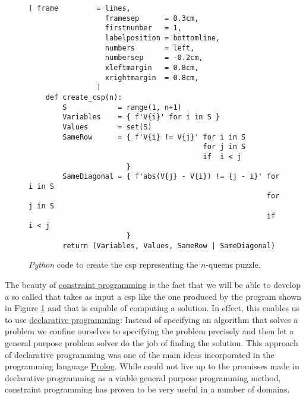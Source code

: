 \begin{figure}[!ht]
\centering
\begin{Verbatim}[ frame         = lines, 
                  framesep      = 0.3cm, 
                  firstnumber   = 1,
                  labelposition = bottomline,
                  numbers       = left,
                  numbersep     = -0.2cm,
                  xleftmargin   = 0.8cm,
                  xrightmargin  = 0.8cm,
                ]
    def create_csp(n):
        S            = range(1, n+1)           
        Variables    = { f'V{i}' for i in S }
        Values       = set(S)
        SameRow      = { f'V{i} != V{j}' for i in S
                                         for j in S
                                         if  i < j 
                       }
        SameDiagonal = { f'abs(V{j} - V{i}) != {j - i}' for i in S
                                                        for j in S 
                                                        if  i < j 
                       }
        return (Variables, Values, SameRow | SameDiagonal)
\end{Verbatim}
\vspace*{-0.3cm}
\caption{\textsl{Python} code to create the \ac{csp} representing the $n$-queens puzzle.}
\label{fig:N-Queens-Problem-CSP.ipynb}
\end{figure}

The beauty of \href{https://en.wikipedia.org/wiki/Constraint_programming}{constraint programming} is the fact
that we will be able to develop a so called  that takes as input a \ac{csp}
like the one produced by the program shown in Figure \ref{fig:N-Queens-Problem-CSP.ipynb} and that is capable of
computing a solution.  In effect, this enables us to use
\href{https://en.wikipedia.org/wiki/Declarative_programming}{declarative programming}:  Instead of specifying
an algorithm that solves a problem we confine ourselves to  specifying the problem precisely and then let a
general purpose problem solver do the job of finding the solution.  This approach of declarative programming 
was one of the main ideas incorporated in the programming language
\href{https://en.wikipedia.org/wiki/Prolog}{Prolog}.  While  could not live up to the promisses
made in declarative programming as a viable general purpose programming method, constraint programming has
proven to be very useful in a number of domains. 

